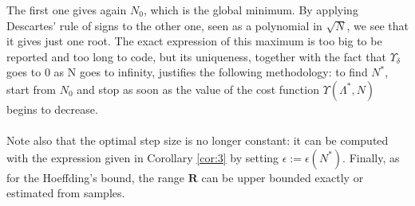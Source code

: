 The first one gives again $N_0$, which is the global minimum. By applying Descartes' rule of signs to the other one, seen as a polynomial in $\sqrt{N}$, we see that it gives just one root. The exact expression of this maximum is too big to be reported and too long to code, but its uniqueness, together with the fact that $\Upsilon_{\delta}$ goes to $0$ as N goes to infinity, justifies the following methodology: to find $N^*$, start from $N_0$ and stop as soon as the value of the cost function $\Upsilon(\Lambda^*,N)$ begins to decrease.
\paragraph{}
Note also that the optimal step size is no longer constant: it can be computed with the expression given in Corollary \ref{cor:3} by setting $\epsilon := \epsilon(N^*)$.
Finally, as for the Hoeffding's bound, the range $\mathbf{R}$ can be upper bounded exactly or estimated from samples.


